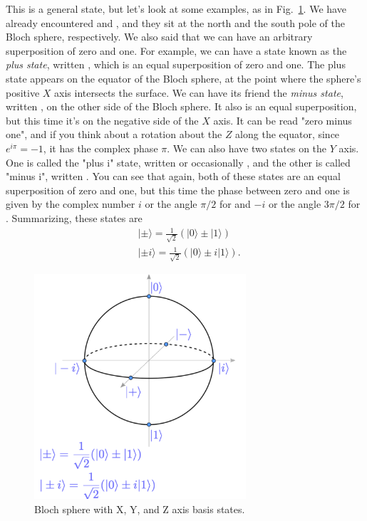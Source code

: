 This \ket{\psi} is a general state, but let's look at some examples, as in Fig.~\ref{fig:annotated-bloch}. We have already encountered  and , and they sit at the north and the south pole of the Bloch sphere, respectively. We also said that we can have an arbitrary superposition of zero and one. For example, we can have a state known as the \emph{plus state}, written \ket{+}, which is an equal superposition of zero and one. The plus state appears on the equator of the Bloch sphere, at the point where the sphere's positive $X$ axis intersects the surface. We can have its friend the \emph{minus state}, written \ket{-}, on the other side of the Bloch sphere. It also is an equal superposition, but this time it's on the negative side of the $X$ axis.  It can be read "zero minus one", and if you think about a rotation about the $Z$ along the equator, since $e^{i\pi} = -1$, it has the complex phase $\pi$.  We can also have two states on the $Y$ axis. One is called the "plus i" state, written  or occasionally , and the other is called "minus i", written . You can see that again, both of these states are an equal superposition of zero and one, but this time the phase between zero and one is given by the complex number $i$ or the angle $\pi/2$ for  and $-i$ or the angle $3\pi/2$ for \ket{-}.  Summarizing, these states are
\begin{equation}
\begin{aligned}
& |\pm\rangle=\frac{1}{\sqrt{2}}(|0\rangle \pm|1\rangle) \\
& |\pm i\rangle=\frac{1}{\sqrt{2}}(|0\rangle \pm i|1\rangle).
\end{aligned}
\end{equation}

\begin{figure}[H]
    \centering
    \includegraphics[width=0.7\textwidth]{lesson2/bloch_sphere_annotated.pdf}
    
        \caption{Bloch sphere with X, Y, and Z axis basis states.}
    
    \label{fig:annotated-bloch}
\end{figure}

